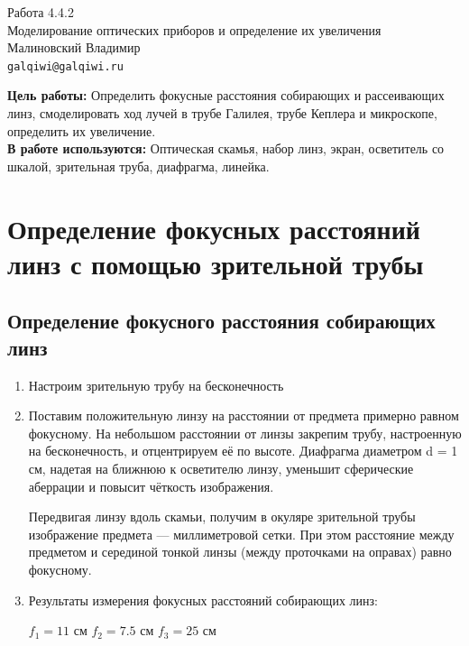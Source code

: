 



\begin{center}
  \LARGE{Работа 4.4.2}\\[0.2cm]
  \LARGE{Моделирование оптических приборов и определение их увеличения}\\[0.2cm]
  \large{Малиновский Владимир}\\[0.2cm]
  \normalsize{\texttt{galqiwi@galqiwi.ru}}
\end{center}

\textbf{Цель работы:} Определить фокусные расстояния собирающих и рассеивающих линз, смоделировать ход лучей в трубе Галилея, трубе Кеплера и микроскопе, определить их увеличение.\\
\textbf{В работе используются:} Оптическая скамья, набор линз, экран, осветитель со шкалой, зрительная труба, диафрагма, линейка.

\section*{Определение фокусных расстояний линз с помощью зрительной трубы}
\subsection*{Определение фокусного расстояния собирающих линз}

\begin{enumerate}
    \item Настроим зрительную трубу на бесконечность
    \item Поставим положительную линзу на
расстоянии от предмета примерно равном фокусному. На небольшом расстоянии от линзы закрепим трубу, настроенную на бесконечность,
и отцентрируем её по высоте. Диафрагма диаметром
d = 1 см, надетая на ближнюю к осветителю линзу, уменьшит сферические аберрации и повысит чёткость изображения. \par
Передвигая линзу вдоль скамьи, получим в окуляре зрительной трубы изображение предмета
— миллиметровой сетки. При этом расстояние между предметом и серединой тонкой линзы (между проточками на оправах) равно фокусному.
    \item Результаты измерения фокусных расстояний собирающих линз:
    \begin{center}
        $f_1 = 11$ см \hspace{1cm}  $f_2 = 7.5$ см \hspace{1cm}  $f_3 = 25$ см
    \end{center}
\end{enumerate}


